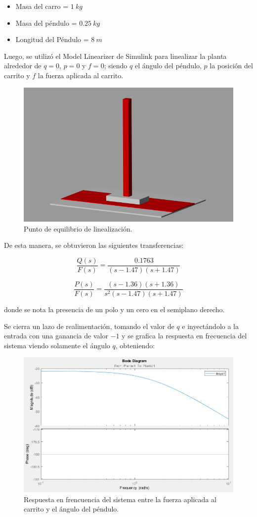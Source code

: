 \begin{itemize}
\item Masa del carro = $1 \ kg$
\item Masa del péndulo = $0.25 \ kg$
\item Longitud del Péndulo = $8 \ m$
\end{itemize}

Luego, se utilizó el Model Linearizer de Simulink para linealizar la planta alrededor de $q=0$, $p=0$ y $f=0$; siendo $q$ el ángulo del péndulo, $p$ la posición del carrito y $f$ la fuerza aplicada al carrito.

\begin{figure}[H]
	\centering
	\includegraphics[width=0.5\linewidth]{equilibrio}
	\caption{Punto de equilibrio de linealización.}
	\label{1_equilibrio}
\end{figure}

De esta manera, se obtuvieron las siguientes transferencias:

\begin{equation}
\frac{Q(s)}{F(s)} = \frac{0.1763}{(s-1.47)(s+1.47)}
\end{equation}

\begin{equation}
\frac{P(s)}{F(s)} = \frac{(s-1.36)(s+1.36)}{s^2(s-1.47)(s+1.47)}
\end{equation}

donde se nota la presencia de un polo y un cero en el semiplano derecho.

Se cierra un lazo de realimentación, tomando el valor de $q$ e inyectándolo a la entrada con una ganancia de valor $-1$ y se grafica la respuesta en frecuencia del sistema viendo solamente el ángulo $q$, obteniendo:

\begin{figure}[H]
	\centering
	\includegraphics[width=0.8\linewidth]{bode_cerrando_q}
	\caption{Respuesta en frencuencia del sistema entre la fuerza aplicada al carrito y el ángulo del péndulo.}
	\label{bode_cerrando_q}
\end{figure}

